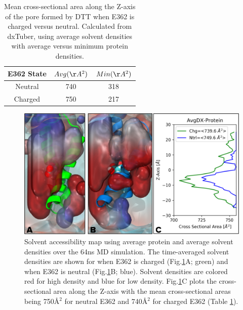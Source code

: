 \begin{table}[H]
\centering
\caption{Mean cross-sectional area along the Z-axis of the pore formed by DTT when E362 is charged versus neutral. Calculated from dxTuber\cite{raunest2011dxtuber}, using average solvent densities with average versus minimum protein densities.}
\label{tbl:dtt_pore}
\begin{tabular}{|c|c|c|}
\hline
\textbf{E362 State}  & \boldmath$Avg(\AA^{2})$ & \boldmath$Min(\AA^{2})$ \\ \hline
Neutral & 740 & 318 \\ \hline
Charged & 750 & 217 \\ \hline
\end{tabular}
\end{table}

\begin{figure}[H]
\centering
\includegraphics[width=\linewidth,]{Figures/DTT/avgdx.png}
\caption{Solvent accessibility map using average protein and average solvent densities over the 64ns MD simulation. The time-averaged solvent densities are shown for when E362 is charged (Fig.\ref{fig:dtt_avgdx}A; green) and when E362 is neutral (Fig.\ref{fig:dtt_avgdx}B; blue). Solvent densities are colored red for high density and blue for low density. Fig.\ref{fig:dtt_avgdx}C plots the cross-sectional area along the Z-axis with the mean cross-sectional areas being 750\AA$^2$ for neutral E362 and 740\AA$^2$ for charged E362 (Table \ref{tbl:dtt_pore}).}
\label{fig:dtt_avgdx}
\end{figure}

